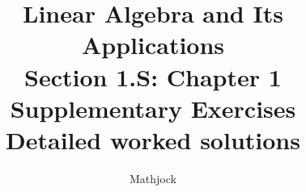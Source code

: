
\title{\textbf{Linear Algebra and Its Applications}\\[0.3em]Section 1.S: Chapter 1 Supplementary Exercises\\[0.3em]\large Detailed worked solutions}
\author{Mathjock}
\date{}

\maketitle
\bookinfo
\tableofcontents
\clearpage
\renewcommand{\thesection}{1.S}
\renewcommand{\theHsection}{1.S}
\setcounter{section}{0}


